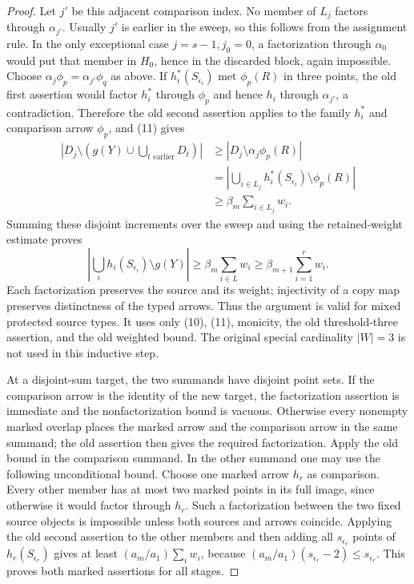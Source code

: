 \begin{proof}
Let $j'$ be this adjacent comparison index. No member of $L_j$
factors through $\alpha_{j'}$. Usually $j'$ is earlier in the sweep,
so this follows from the assignment rule. In the only exceptional
case $j=s-1,j_0=0$, a factorization through $\alpha_0$ would put that
member in $H_0$, hence in the discarded block, again impossible.
Choose $\alpha_j\phi_p=\alpha_{j'}\phi_q$ as above. If
$h_i^*(S_{\epsilon_i})$ met $\phi_p(R)$ in three points, the old
first assertion would factor $h_i^*$ through $\phi_p$ and hence
$h_i$ through $\alpha_{j'}$, a contradiction. Therefore the old
second assertion applies to the family $h_i^*$ and comparison arrow
$\phi_p$, and (11) gives
\[
 \begin{split}
 \left|D_j\setminus\left(g(Y)\cup
               \bigcup_{t\text{ earlier}}D_t\right)\right|
 &\geq\left|D_j\setminus\alpha_j\phi_p(R)\right|\\
 &=\left|\bigcup_{i\in L_j}h_i^*(S_{\epsilon_i})
                         \setminus\phi_p(R)\right|\\
 &\geq\beta_m\sum_{i\in L_j}w_i.
 \end{split}
\]
Summing these disjoint increments over the sweep and using the
retained-weight estimate proves
\[
 \left|\bigcup_i h_i(S_{\epsilon_i})\setminus g(Y)\right|
 \geq\beta_m\sum_{i\in L}w_i
 \geq\beta_{m+1}\sum_{i=1}^r w_i.
\]
Each factorization preserves the source and its weight; injectivity
of a copy map preserves distinctness of the typed arrows. Thus the
argument is valid for mixed protected source types. It uses only
(10), (11), monicity, the old threshold-three assertion, and the old
weighted bound. The original special cardinality $|W|=3$ is not
used in this inductive step.

At a disjoint-sum target, the two summands have disjoint point sets.
If the comparison arrow is the identity of the new target, the
factorization assertion is immediate and the nonfactorization bound
is vacuous. Otherwise every nonempty marked overlap places the marked
arrow and the comparison arrow in the same summand; the old assertion
then gives the required factorization.
Apply the old bound in the comparison summand. In the other summand
one may use the following unconditional bound. Choose one marked
arrow $h_r$ as comparison. Every other member has at most two marked
points in its full image, since otherwise it would factor through
$h_r$. Such a factorization between the two fixed source objects is
impossible unless both sources and arrows coincide. Applying the old
second assertion to the other members and then adding all
$s_{\epsilon_r}$ points of $h_r(S_{\epsilon_r})$ gives at least
$(a_m/a_1)\sum_iw_i$, because
$(a_m/a_1)(s_{\epsilon_r}-2)\leq s_{\epsilon_r}$. This proves both
marked assertions for all stages.


\end{proof}
